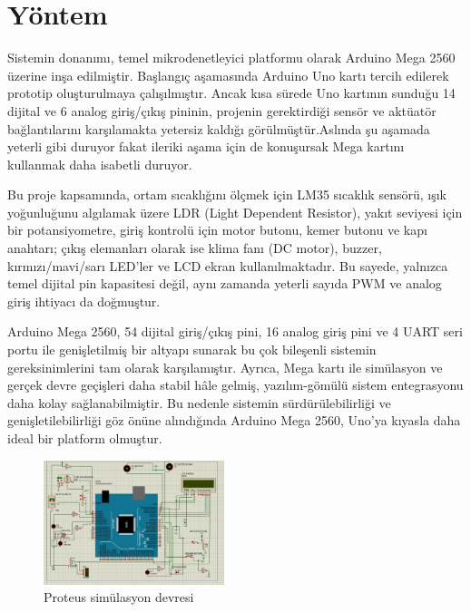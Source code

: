 \documentclass[conference]{IEEEtran}
\begin{document}
\section{Yöntem}
Sistemin donanımı, temel mikrodenetleyici platformu olarak Arduino Mega 2560 üzerine inşa edilmiştir. Başlangıç aşamasında Arduino Uno kartı tercih edilerek prototip oluşturulmaya çalışılmıştır. Ancak kısa sürede Uno kartının sunduğu 14 dijital ve 6 analog giriş/çıkış pininin, projenin gerektirdiği sensör ve aktüatör bağlantılarını karşılamakta yetersiz kaldığı görülmüştür.Aslında şu aşamada yeterli gibi duruyor fakat ileriki aşama için de konuşursak Mega kartını kullanmak daha isabetli duruyor.

Bu proje kapsamında, ortam sıcaklığını ölçmek için LM35 sıcaklık sensörü, ışık yoğunluğunu algılamak üzere LDR (Light Dependent Resistor), yakıt seviyesi için bir potansiyometre, giriş kontrolü için motor butonu, kemer butonu ve kapı anahtarı; çıkış elemanları olarak ise klima fanı (DC motor), buzzer, kırmızı/mavi/sarı LED’ler ve LCD ekran kullanılmaktadır. Bu sayede, yalnızca temel dijital pin kapasitesi değil, aynı zamanda yeterli sayıda PWM ve analog giriş ihtiyacı da doğmuştur.

Arduino Mega 2560, 54 dijital giriş/çıkış pini, 16 analog giriş pini ve 4 UART seri portu ile genişletilmiş bir altyapı sunarak bu çok bileşenli sistemin gereksinimlerini tam olarak karşılamıştır. Ayrıca, Mega kartı ile simülasyon ve gerçek devre geçişleri daha stabil hâle gelmiş, yazılım-gömülü sistem entegrasyonu daha kolay sağlanabilmiştir. Bu nedenle sistemin sürdürülebilirliği ve genişletilebilirliği göz önüne alındığında Arduino Mega 2560, Uno’ya kıyasla daha ideal bir platform olmuştur.



\begin{figure}[H]
\centering
\includegraphics[width=0.47\textwidth]{simulasyon_gorselleri.pdf}
\caption{Proteus simülasyon devresi}
\end{figure}
\end{document}
